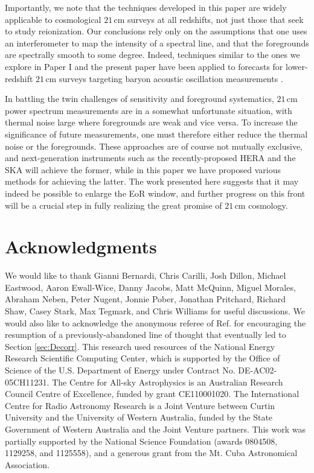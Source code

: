\documentclass[twocolumn,aps,prd,nofootinbib,showpacs]{revtex4-1}
\begin{document}
Importantly, we note that the techniques developed in this paper are widely applicable to cosmological $21\,\textrm{cm}$ surveys at all redshifts, not just those that seek to study reionization.  Our conclusions rely only on the assumptions that one uses an interferometer to map the intensity of a spectral line, and that the foregrounds are spectrally smooth to some degree.  Indeed, techniques similar to the ones we explore in Paper I and the present paper have been applied to forecasts for lower-redshift $21\,\textrm{cm}$ surveys targeting baryon acoustic oscillation measurements \cite{Shaw2014a,Shaw2014b}.

In battling the twin challenges of sensitivity and foreground systematics, $21\,\textrm{cm}$ power spectrum measurements are in a somewhat unfortunate situation, with thermal noise large where foregrounds are weak and vice versa.  To increase the significance of future measurements, one must therefore either reduce the thermal noise or the foregrounds.  These approaches are of course not mutually exclusive, and next-generation instruments such as the recently-proposed HERA \cite{Pober2014} and the SKA will achieve the former, while in this paper we have proposed various methods for achieving the latter.  The work presented here suggests that it may indeed be possible to enlarge the EoR window, and further progress on this front will be a crucial step in fully realizing the great promise of $21\,\textrm{cm}$ cosmology.

\section*{Acknowledgments}
We would like to thank Gianni Bernardi, Chris Carilli, Josh Dillon, Michael Eastwood, Aaron Ewall-Wice, Danny Jacobs, Matt McQuinn, Miguel Morales, Abraham Neben, Peter Nugent, Jonnie Pober, Jonathan Pritchard, Richard Shaw, Casey Stark, Max Tegmark, and Chris Williams for useful discussions.  We would also like to acknowledge the anonymous referee of Ref. \cite{Dillon2014} for encouraging the resumption of a previously-abandoned line of thought that eventually led to Section \ref{sec:Decorr}.  
This research used resources of the National Energy Research
Scientific Computing Center, which is supported by the Office of
Science of the U.S. Department of Energy under Contract No. 
DE-AC02-05CH11231.  The Centre for All-sky Astrophysics is an Australian Research Council Centre of Excellence, funded by grant CE110001020. The International Centre for Radio Astronomy Research is a Joint Venture between Curtin University and the University of Western Australia, funded by the State Government of Western Australia and the Joint Venture partners.  This work was partially supported by the National Science Foundation (awards 0804508, 1129258, and 1125558), and a generous grant from the Mt. Cuba Astronomical Association.



\end{document}
